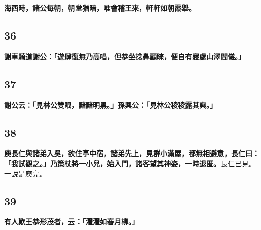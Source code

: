 \textbf{海西時，諸公每朝，朝堂猶暗，唯會稽王來，軒軒如朝霞舉。}

\subsection*{36}

\textbf{謝車騎道謝公：「遊肆復無乃高唱，但恭坐捻鼻顧睞，便自有寢處山澤間儀。」}

\subsection*{37}

\textbf{謝公云：「見林公雙眼，黯黯明黑。」孫興公：「見林公稜稜露其爽。」}

\subsection*{38}

\textbf{庾長仁與諸弟入吳，欲住亭中宿，諸弟先上，見群小滿屋，都無相避意，長仁曰：「我試觀之。」乃策杖將一小兒，始入門，諸客望其神姿，一時退匿。}{\footnotesize 長仁已見。一說是庾亮。}

\subsection*{39}

\textbf{有人歎王恭形茂者，云：「濯濯如春月柳。」}